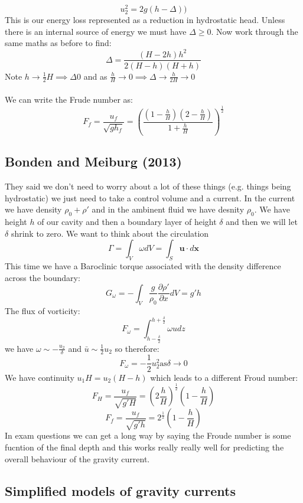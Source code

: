 \documentclass{article}
\begin{document}
        $$
         u_2^2 = 2g(h- \Delta))
        $$
        This is our energy loss represented as a reduction in hydrostatic head. Unless there is an internal source of energy we must have $\Delta \geq 0$. Now work through the same maths as before to find:
        $$
         \Delta = \frac{(H- 2h)h^2}{2(H-h) (H+h)}
        $$
        Note $h \rightarrow \frac{1}{2}H \implies \Delta 0$ and as $\frac{h}{H} \rightarrow 0 \implies \Delta \rightarrow \frac{h}{2H} \rightarrow 0$\\\\
        We can write the Frude number as:
        $$
         F_f = \frac{u_f}{ \sqrt{g h_f}} = ( \frac{(1- \frac{h}{H})(2- \frac{h}{H})}{1 + \frac{h}{H}})^{\frac{1}{2}}
        $$
        \subsection{Bonden and Meiburg (2013)}
        They said we don't need to worry about a lot of these things (e.g. things being hydrostatic) we just need to take a control volume and a current. In the current we have density $\rho_0 + \rho'$ and in the ambinent fluid we have desnity $\rho_0$. We have height $h$ of our cavity and then a boundary layer of height $\delta$ and then we will let $\delta$ shrink to zero. We want to think about the circulation
        $$
         \Gamma = \int_V \omega dV = \int_S \bm u \cdot d \bm x
        $$
        This time we have a Baroclinic torque associated with the density difference across the boundary:
        $$
         G_{\omega} = - \int_V \frac{g}{\rho_0} \frac{\partial \rho'}{\partial x} dV = g' h
        $$
        The flux of vorticity:
        $$
         F_{\omega} = \int_{h- \frac{\delta}{2}}^{h + \frac{\delta}{2}} \omega u dz
        $$
         we have $\omega \sim - \frac{u_2}{\delta}$ and $\bar u \sim \frac{1}{2} u_2$ so therefore:
         $$
          F_{\omega} = - \frac{1}{2} u_2^2 \text{as} \delta \rightarrow 0
         $$
         We have continuity $u_1 H = u_2 (H- h)$ which leads to a different Froud number:
         $$
         F_H = \frac{u_f}{\sqrt{g' H}} = ( 2 \frac{h}{H})^{\frac{1}{2}}( 1- \frac{h}{H})
         $$
         $$
          F_f = \frac{u_f}{\sqrt{g'h}} = 2^{\frac{1}{2}} ( 1- \frac{h}{H})
         $$
         In exam questions we can get a long way by saying the Froude number is some fucntion of the final depth and this works really really well for predicting the overall behaviour of the gravity current.
         \subsection{Simplified models of gravity currents}
\end{document}
